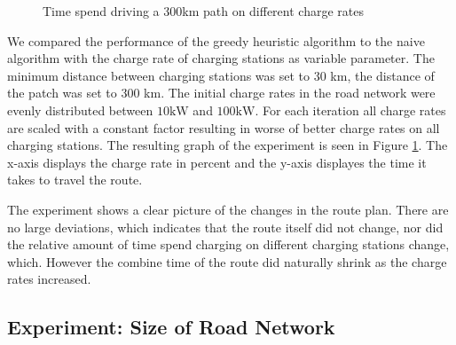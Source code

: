 \begin{figure}
\centering
{}
\caption{Time spend driving a 300km path on different charge rates} 
\label{fig:charge_rate}
\end{figure}

We compared the performance of the greedy heuristic algorithm to the naive algorithm with the charge rate of charging stations as variable parameter. The minimum distance between charging stations was set to 30 km, the distance of the patch was set to 300 km. The initial charge rates in the road network were evenly distributed between $10 \si{\kW}$ and $100 \si{\kW}$. For each iteration all charge rates are scaled with a constant factor resulting in worse of better charge rates on all charging stations. The resulting graph of the experiment is seen in Figure \ref{fig:charge_rate}. The x-axis displays the charge rate in percent and the y-axis displayes the time it takes to travel the route.

The experiment shows a clear picture of the changes in the route plan. There are no large deviations, which indicates that the route itself did not change, nor did the relative amount of time spend charging on different charging stations change, which. However the combine time of the route did naturally shrink as the charge rates increased. 

\subsection{Experiment: Size of Road Network}